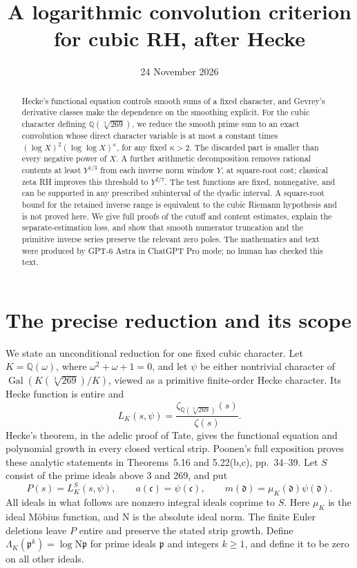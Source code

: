 \documentclass[11pt]{article}
\title{A logarithmic convolution criterion for cubic RH, after Hecke}
\author{}
\date{24 November 2026}
\newcommand{\N}{\mathrm N}
\newcommand{\Q}{\mathbb Q}
\begin{document}
\maketitle
\begin{abstract}
Hecke's functional equation controls smooth sums of a fixed character, and Gevrey's derivative classes make the dependence on the smoothing explicit. For the cubic character defining $\mathbb Q(\sqrt[3]{269})$, we reduce the smooth prime sum to an exact convolution whose direct character variable is at most a constant times $(\log X)^2(\log\log X)^\kappa$, for any fixed $\kappa>2$. The discarded part is smaller than every negative power of $X$. A further arithmetic decomposition removes rational contents at least $Y^{1/3}$ from each inverse norm window $Y$, at square-root cost; classical zeta RH improves this threshold to $Y^{2/7}$. The test functions are fixed, nonnegative, and can be supported in any prescribed subinterval of the dyadic interval. A square-root bound for the retained inverse range is equivalent to the cubic Riemann hypothesis and is not proved here. We give full proofs of the cutoff and content estimates, explain the separate-estimation loss, and show that smooth numerator truncation and the primitive inverse series preserve the relevant zero poles. The mathematics and text were produced by GPT-6 Astra in ChatGPT Pro mode; no human has checked this text.
\end{abstract}

\section{The precise reduction and its scope}
We state an unconditional reduction for one fixed cubic character.
Let $K=\Q(\omega)$, where $\omega^2+\omega+1=0$, and let $\psi$
be either nontrivial character of
$\operatorname{Gal}(K(\sqrt[3]{269})/K)$, viewed as a primitive
finite-order Hecke character. Its Hecke function is entire and
\[
 L_K(s,\psi)=
 \frac{\zeta_{\Q(\sqrt[3]{269})}(s)}{\zeta(s)}.
\]
Hecke's theorem, in the adelic proof of Tate, gives the functional
equation and polynomial growth in every closed vertical strip.
Poonen's full exposition proves these analytic statements in
Theorems~5.16 and 5.22(b,c), pp.~34--39.
Let $S$ consist of the prime ideals above 3 and 269, and put
\[
 P(s)=L_K^S(s,\psi),\qquad
 a(\mathfrak c)=\psi(\mathfrak c),\qquad
 m(\mathfrak d)=\mu_K(\mathfrak d)\psi(\mathfrak d).
\]
All ideals in what follows are nonzero integral ideals coprime to $S$.
Here $\mu_K$ is the ideal M\"obius function, and $\N$ is the absolute
ideal norm. The finite Euler deletions leave $P$ entire and preserve
the stated strip growth.
Define $\Lambda_K(\mathfrak p^k)=\log\N\mathfrak p$ for prime ideals
$\mathfrak p$ and integers $k\ge1$, and define it to be zero on all
other ideals.
\end{document}
